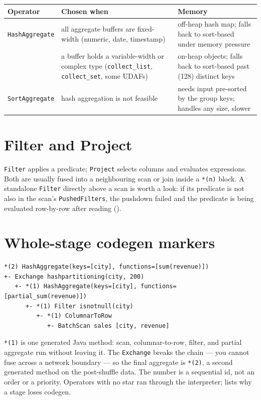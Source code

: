 \begin{table}[H]
\centering\footnotesize
\renewcommand{\arraystretch}{1.2}
\begin{tabular}{@{}P{3.4cm}P{4.6cm}P{5.4cm}@{}}
\toprule
\textbf{Operator} & \textbf{Chosen when} & \textbf{Memory} \\
\midrule
\texttt{HashAggregate} & all aggregate buffers are fixed-width (numeric, date, timestamp) & off-heap hash map; falls back to sort-based under memory pressure \\
 & a buffer holds a variable-width or complex type (\texttt{collect\_list}, \texttt{collect\_set}, some UDAFs) & on-heap objects; falls back to sort-based past  (128) distinct keys \\
\texttt{SortAggregate} & hash aggregation is not feasible & needs input pre-sorted by the group keys; handles any size, slower \\
\bottomrule
\end{tabular}
\end{table}

\section{Filter and Project}

\texttt{Filter} applies a predicate; \texttt{Project} selects columns and
evaluates expressions. Both are usually fused into a neighbouring scan or join
inside a \texttt{*(n)} block. A standalone \texttt{Filter} directly above a scan
is worth a look: if its predicate is not also in the scan's
\texttt{PushedFilters}, the pushdown failed and the predicate is being evaluated
row-by-row after reading ().

\section{Whole-stage codegen markers}
\label{sec:c-codegen}

\begin{lstlisting}[language=text,numbers=none]
*(2) HashAggregate(keys=[city], functions=[sum(revenue)])
+- Exchange hashpartitioning(city, 200)
   +- *(1) HashAggregate(keys=[city], functions=[partial_sum(revenue)])
      +- *(1) Filter isnotnull(city)
         +- *(1) ColumnarToRow
            +- BatchScan sales [city, revenue]
\end{lstlisting}

\texttt{*(1)} is one generated Java method: scan, columnar-to-row, filter, and
partial aggregate run without leaving it. The \texttt{Exchange} breaks the chain
--- you cannot fuse across a network boundary --- so the final aggregate is
\texttt{*(2)}, a second generated method on the post-shuffle data. The number is
a sequential id, not an order or a priority. Operators with no star ran through
the interpreter;  lists why a stage loses codegen.

